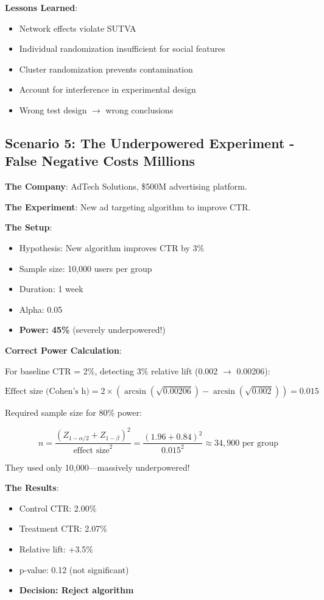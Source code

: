 \textbf{Lessons Learned}:
\begin{itemize}
    \item Network effects violate SUTVA
    \item Individual randomization insufficient for social features
    \item Cluster randomization prevents contamination
    \item Account for interference in experimental design
    \item Wrong test design $\rightarrow$ wrong conclusions
\end{itemize}

\subsection{Scenario 5: The Underpowered Experiment - False Negative Costs Millions}

\textbf{The Company}: AdTech Solutions, \$500M advertising platform.

\textbf{The Experiment}: New ad targeting algorithm to improve CTR.

\textbf{The Setup}:

\begin{itemize}
    \item Hypothesis: New algorithm improves CTR by 3\%
    \item Sample size: 10,000 users per group
    \item Duration: 1 week
    \item Alpha: 0.05
    \item \textbf{Power: 45\%} (severely underpowered!)
\end{itemize}

\textbf{Correct Power Calculation}:

For baseline CTR = 2\%, detecting 3\% relative lift (0.002 $\rightarrow$ 0.00206):

\[
\text{Effect size (Cohen's h)} = 2 \times \left(\arcsin(\sqrt{0.00206}) - \arcsin(\sqrt{0.002})\right) = 0.015
\]

Required sample size for 80\% power:

\[
n = \frac{(Z_{1-\alpha/2} + Z_{1-\beta})^2}{\text{effect size}^2} = \frac{(1.96 + 0.84)^2}{0.015^2} \approx 34,900 \text{ per group}
\]

They used only 10,000---massively underpowered!

\textbf{The Results}:

\begin{itemize}
    \item Control CTR: 2.00\%
    \item Treatment CTR: 2.07\%
    \item Relative lift: +3.5\%
    \item p-value: 0.12 (not significant)
    \item \textbf{Decision: Reject algorithm}
\end{itemize}

